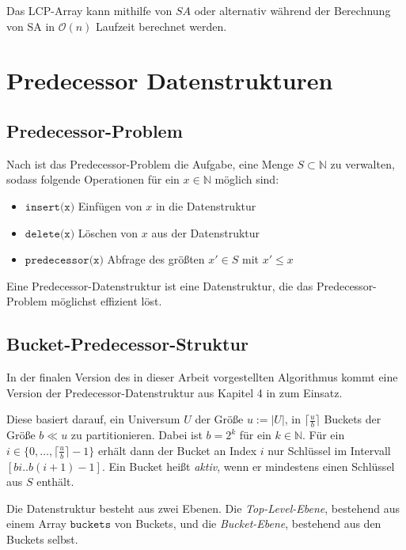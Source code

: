 Das LCP-Array kann mithilfe von $SA$ \cite{kasai_linear-time_2001} oder alternativ während der Berechnung von SA \cite{fischer_inducing_2011} in $\mathcal{O}(n)$ Laufzeit berechnet werden.

\section{Predecessor Datenstrukturen}

\subsection{Predecessor-Problem}

Nach \cite{dinklage_engineering_2021} ist das Predecessor-Problem die Aufgabe, eine Menge $S \subset \mathbb{N}$ zu verwalten, sodass folgende Operationen für ein $x \in \mathbb{N}$ möglich sind:

\begin{itemize}
	\item $\texttt{insert(x)}$ Einfügen von $x$ in die Datenstruktur
	\item $\texttt{delete(x)}$ Löschen von $x$ aus der Datenstruktur
	\item $\texttt{predecessor(x)}$ Abfrage des größten $x' \in S$ mit $x' \leq x$
\end{itemize}

Eine Predecessor-Datenstruktur ist eine Datenstruktur, die das Predecessor-Problem möglichst effizient löst.

\subsection{Bucket-Predecessor-Struktur}
\label{bucketpredds}

In der finalen Version des in dieser Arbeit vorgestellten Algorithmus kommt eine Version der Predecessor-Datenstruktur aus Kapitel 4 in \cite{dinklage_engineering_2021} zum Einsatz.

Diese basiert darauf, ein Universum $U$ der Größe $u := |U|$, in $\lceil \tfrac{u}{b} \rceil$ Buckets der Größe $b \ll u$ zu partitionieren. Dabei ist $b = 2^k$ für ein $k \in \mathbb{N}$. Für ein $i \in \{0, \dots, \lceil \tfrac{u}{b} \rceil - 1 \}$ erhält dann der Bucket an Index $i$ nur Schlüssel im Intervall $[bi.. b(i + 1) - 1]$. Ein Bucket heißt \emph{aktiv}, wenn er mindestens einen Schlüssel aus $S$ enthält.

Die Datenstruktur besteht aus zwei Ebenen. Die \emph{Top-Level-Ebene}, bestehend aus einem Array $\texttt{buckets}$ von Buckets, und die \emph{Bucket-Ebene}, bestehend aus den Buckets selbst.

